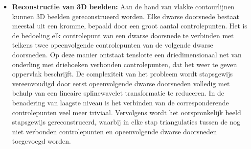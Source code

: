 \begin{enumerate}
{\begin{itemize}
		\item \textbf{Reconstructie van 3D beelden:} Aan de hand van vlakke contourlijnen kunnen 3D beelden gereconstrueerd worden. Elke dwarse doorsnede bestaat meestal uit een kromme, bepaald door een groot aantal controlepunten. Het is de bedoeling elk controlepunt van een dwarse doorsnede te verbinden met telkens twee opeenvolgende controlepunten van de volgende dwarse doorsneden. Op deze manier ontstaat tenslotte een driedimensionaal net van onderling met driehoeken verbonden controlepunten, dat het weer te geven oppervlak beschrijft. De complexiteit van het probleem wordt stapsgewijs vereenvoudigd door eerst opeenvolgende dwarse doorsneden volledig met behulp van een lineaire splinewavelet transformatie te reduceren. In de benadering van laagste niveau is het verbinden van de corresponderende controlepunten veel meer triviaal. Vervolgens wordt het oorspronkelijk beeld stapsgewijs gereconstrueerd, waarbij in elke stap triangulaties tussen de nog niet verbonden controlepunten en opeenvolgende dwarse doorsneden toegevoegd worden.
	\end{itemize}}
			

\end{enumerate}
